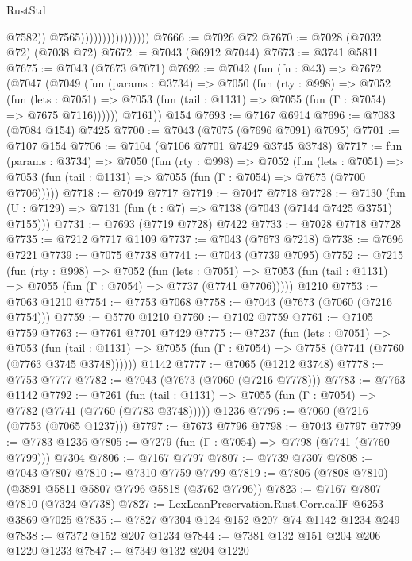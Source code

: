 \begin{lexlean}{RustStd}
\begin{coremodule}
                                        @7582))
                                    @7565))))))))))))))))
@7666 := @7026 @72
@7670 := @7028 (@7032 @72) (@7038 @72)
@7672 := @7043 (@6912 @7044)
@7673 := @3741 @5811
@7675 := @7043 (@7673 @7071)
@7692 := @7042
    (fun (fn : @43) =>
    @7672
      (@7047
        (@7049
          (fun (params : @3734) =>
          @7050
            (fun (rty : @998) =>
            @7052
              (fun (lets : @7051) =>
              @7053 (fun (tail : @1131) => @7055 (fun (Γ : @7054) => @7675 @7116))))))
        @7161))
    @154
@7693 := @7167 @6914
@7696 := @7083 (@7084 @154) @7425
@7700 := @7043 (@7075 (@7696 @7091) @7095)
@7701 := @7107 @154
@7706 := @7104 (@7106 @7701 @7429 @3745 @3748)
@7717 := fun (params : @3734) =>
  @7050
    (fun (rty : @998) =>
    @7052
      (fun (lets : @7051) =>
      @7053 (fun (tail : @1131) => @7055 (fun (Γ : @7054) => @7675 (@7700 @7706)))))
@7718 := @7049 @7717
@7719 := @7047 @7718
@7728 := @7130 (fun (U : @7129) => @7131 (fun (t : @7) => @7138 (@7043 (@7144 @7425 @3751) @7155)))
@7731 := @7693 (@7719 @7728) @7422
@7733 := @7028 @7718 @7728
@7735 := @7212 @7717 @1109
@7737 := @7043 (@7673 @7218)
@7738 := @7696 @7221
@7739 := @7075 @7738
@7741 := @7043 (@7739 @7095)
@7752 := @7215
    (fun (rty : @998) =>
    @7052
      (fun (lets : @7051) =>
      @7053 (fun (tail : @1131) => @7055 (fun (Γ : @7054) => @7737 (@7741 @7706)))))
    @1210
@7753 := @7063 @1210
@7754 := @7753 @7068
@7758 := @7043 (@7673 (@7060 (@7216 @7754)))
@7759 := @5770 @1210
@7760 := @7102 @7759
@7761 := @7105 @7759
@7763 := @7761 @7701 @7429
@7775 := @7237
    (fun (lets : @7051) =>
    @7053
      (fun (tail : @1131) => @7055 (fun (Γ : @7054) => @7758 (@7741 (@7760 (@7763 @3745 @3748))))))
    @1142
@7777 := @7065 (@1212 @3748)
@7778 := @7753 @7777
@7782 := @7043 (@7673 (@7060 (@7216 @7778)))
@7783 := @7763 @1142
@7792 := @7261
    (fun (tail : @1131) => @7055 (fun (Γ : @7054) => @7782 (@7741 (@7760 (@7783 @3748)))))
    @1236
@7796 := @7060 (@7216 (@7753 (@7065 @1237)))
@7797 := @7673 @7796
@7798 := @7043 @7797
@7799 := @7783 @1236
@7805 := @7279 (fun (Γ : @7054) => @7798 (@7741 (@7760 @7799))) @7304
@7806 := @7167 @7797
@7807 := @7739 @7307
@7808 := @7043 @7807
@7810 := @7310 @7759 @7799
@7819 := @7806 (@7808 @7810) (@3891 @5811 @5807 @7796 @5818 (@3762 @7796))
@7823 := @7167 @7807 @7810 (@7324 @7738)
@7827 := LexLeanPreservation.Rust.Corr.callF @6253 @3869 @7025
@7835 := @7827 @7304 @124 @152 @207 @74 @1142 @1234 @249
@7838 := @7372 @152 @207 @1234
@7844 := @7381 @132 @151 @204 @206 @1220 @1233
@7847 := @7349 @132 @204 @1220

\end{coremodule}
\end{lexlean}
